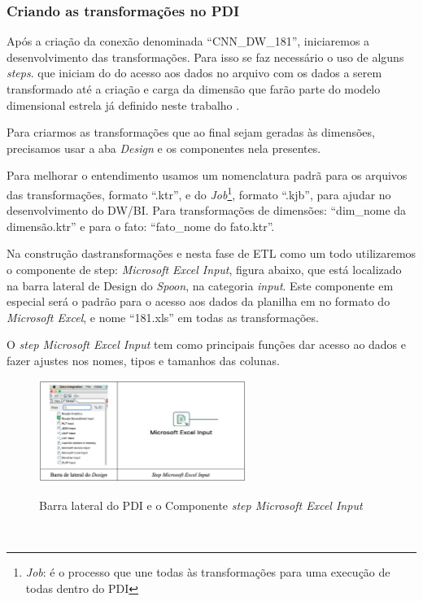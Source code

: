 \subsubsection{Criando as transforma\c{c}\~{o}es no PDI}

Ap\'os a criação da conex\~{a}o denominada ``CNN\_DW\_181'', iniciaremos a desenvolvimento das transforma\c{c}\~{o}es. Para isso se faz necess\'{a}rio o uso de alguns \textit{steps}. que iniciam do do acesso aos dados no arquivo com os dados a serem transformado at\'{e} a cria\c{c}\~{a}o e carga da dimens\~{a}o que far\~{a}o parte do modelo dimensional estrela j\'{a} definido neste trabalho  \cite{dw-kimball-2013}.

Para criarmos as transforma\c{c}\~{o}es que ao final sejam geradas \`{a}s dimens\~{o}es, precisamos usar a aba \textit{Design} e os componentes nela presentes.

Para melhorar o entendimento usamos um nomenclatura padr\~{a} para os arquivos das transforma\c{c}\~{o}es, formato ``.ktr'', e do \textit{Job}\footnote{\textit{Job}: \'{e} o processo que une todas \`{a}s transforma\c{c}\~{o}es para uma execu\c{c}\~{a}o de todas dentro do PDI}, formato ``.kjb'', para ajudar no desenvolvimento do DW/BI. 
Para transforma\c{c}\~{o}es de dimens\~{o}es: ``dim\_nome da dimens\~{a}o.ktr'' e para o fato: ``fato\_nome do fato.ktr''.

Na constru\c{c}\~{a}o dastransforma\c{c}\~{o}es e nesta fase de ETL como um todo utilizaremos o componente de step: \textit{Microsoft Excel Input}, figura abaixo, que est\'{a} localizado na barra lateral de Design do \textit{Spoon}, na categoria \textit{input}. Este componente em especial ser\'{a} o padr\~{a}o para o acesso aos dados da planilha em no formato do \textit{Microsoft Excel}, e nome ``181.xls'' em todas as transforma\c{c}\~{o}es.

O \textit{step Microsoft Excel Input} tem como principais fun\c{c}\~{o}es dar acesso ao dados e fazer ajustes nos nomes, tipos e tamanhos das colunas.

\begin{figure}[H]
	\vspace*{0,2cm}
    \centering
    \caption{Barra lateral do PDI e o Componente \textit{step Microsoft Excel Input}}
    \includegraphics[width=0.6\textwidth]{./04-figuras/figura-barra-lateral-step-mei.png}
    \label{fig:ilustfigbarralateralstepmei}
\end{figure}
\vspace*{-0,9cm}
{\raggedright {}} \\

